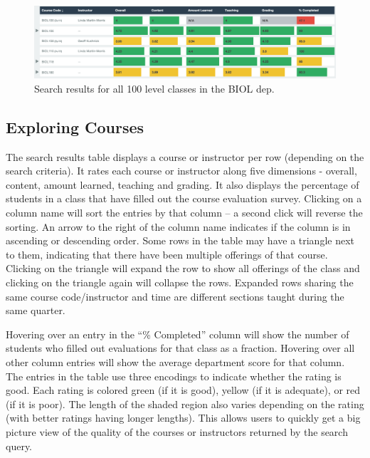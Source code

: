 \documentclass{chi2009}
\begin{document}
\begin{figure}[t]
\begin{center}
\includegraphics[width=\columnwidth]{figs/searchResults.png}
\vspace*{-0.25in}
\caption{Search results for all 100 level classes in the BIOL dep.}
\label{fig:searchResults}
\end{center}
\end{figure}

\subsection{Exploring Courses}
The search results table displays a course or instructor per row (depending on the search criteria). It rates each course or instructor along five dimensions - overall, content, amount learned, teaching and grading. It also displays the percentage of students in a class that have filled out the course evaluation survey. Clicking on a column name will sort the entries by that column -- a second click will reverse the sorting. An arrow to the right of the column name indicates if the column is in ascending or descending order. Some rows in the table may have a triangle next to them, indicating that there have been multiple offerings of that course. Clicking on the triangle will expand the row to show all offerings of the class and clicking on the triangle again will collapse the rows.  Expanded rows sharing the same course code/instructor and time are different sections taught during the same quarter.

Hovering over an entry in the ``\% Completed'' column will show the number of students who filled out evaluations for that class as a fraction. Hovering over all other column entries will show the average department score for that column. The entries in the table use three encodings to indicate whether the rating is good. Each rating is colored green (if it is good), yellow (if it is adequate), or red (if it is poor). The length of the shaded region also varies depending on the rating (with better ratings having longer lengths). This allows users to quickly get a big picture view of the quality of the courses or instructors returned by the search query.
\end{document}
